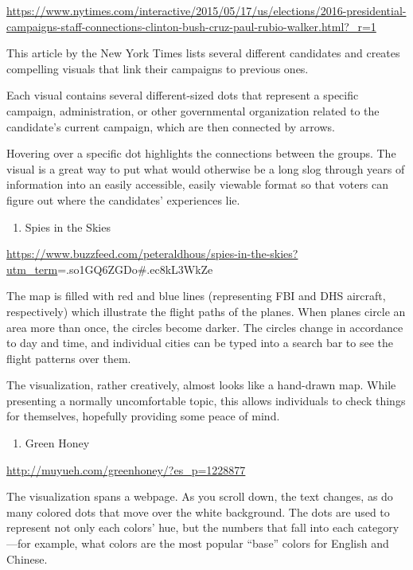 \documentclass[]{book}
\providecommand{\tightlist}{%
  \setlength{\itemsep}{0pt}\setlength{\parskip}{0pt}}
\theoremstyle{definition}
\theoremstyle{definition}
\theoremstyle{definition}
\theoremstyle{remark}
\begin{document}
\url{https://www.nytimes.com/interactive/2015/05/17/us/elections/2016-presidential-campaigns-staff-connections-clinton-bush-cruz-paul-rubio-walker.html?_r=1}

This article by the New York Times lists several different candidates
and creates compelling visuals that link their campaigns to previous
ones.

Each visual contains several different-sized dots that represent a
specific campaign, administration, or other governmental organization
related to the candidate's current campaign, which are then connected by
arrows.

Hovering over a specific dot highlights the connections between the
groups. The visual is a great way to put what would otherwise be a long
slog through years of information into an easily accessible, easily
viewable format so that voters can figure out where the candidates'
experiences lie.

\begin{enumerate}
\def\labelenumi{\arabic{enumi}.}
\setcounter{enumi}{1}
\tightlist
\item
  Spies in the Skies
\end{enumerate}

\url{https://www.buzzfeed.com/peteraldhous/spies-in-the-skies?utm_term}=.so1GQ6ZGDo\#.ec8kL3WkZe

The map is filled with red and blue lines (representing FBI and DHS
aircraft, respectively) which illustrate the flight paths of the planes.
When planes circle an area more than once, the circles become darker.
The circles change in accordance to day and time, and individual cities
can be typed into a search bar to see the flight patterns over them.

The visualization, rather creatively, almost looks like a hand-drawn
map. While presenting a normally uncomfortable topic, this allows
individuals to check things for themselves, hopefully providing some
peace of mind.

\begin{enumerate}
\def\labelenumi{\arabic{enumi}.}
\setcounter{enumi}{2}
\tightlist
\item
  Green Honey
\end{enumerate}

\url{http://muyueh.com/greenhoney/?es_p=1228877}

The visualization spans a webpage. As you scroll down, the text changes,
as do many colored dots that move over the white background. The dots
are used to represent not only each colors' hue, but the numbers that
fall into each category---for example, what colors are the most popular
``base'' colors for English and Chinese.
\end{document}
